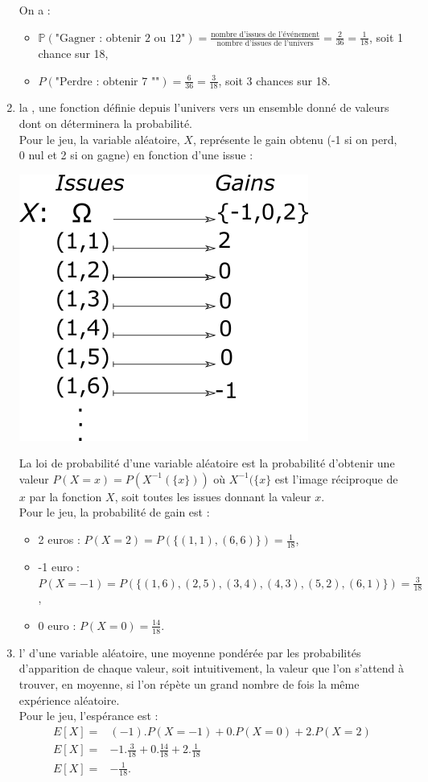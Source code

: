 \documentclass{book}
\begin{document}
\begin{enumerate}
\begin{center}
\end{center}
 On a :    
\begin{itemize}
\item $\mathbb{P}(\text{"Gagner : obtenir 2 ou 12"})=\frac{\text{nombre d'issues de l'événement}}{\text{nombre d'issues de l'univers}}=\frac{2}{36}=\frac{1}{18}$, soit 1 chance sur 18,
\item $P(\text{"Perdre : obtenir 7 ""})=\frac{6}{36}=\frac{3}{18}$, soit 3 chances sur 18.
\end{itemize}
\item  la , une fonction définie depuis l'univers vers un ensemble donné de valeurs dont on déterminera la probabilité.\\ 
Pour le jeu, la variable aléatoire, $X$, représente le gain obtenu (-1 si on perd, 0 nul et 2 si on gagne) en fonction d'une issue :
\begin{center}
\includegraphics[scale=0.5]{va.png}
\end{center}
La loi de probabilité d'une variable aléatoire est la probabilité d'obtenir une valeur $P(X=x)=P(X^{-1}(\{x\}))$ où $X^{-1}(\{x\}$ est l'image réciproque de $x$ par la fonction $X$,  soit toutes les issues donnant la valeur $x$.\\
Pour le jeu, la probabilité de gain est :
\begin{itemize}
\item  2 euros : $P(X=2)=P( \{(1,1),(6,6)\})=\frac{1}{18}$,
\item  -1 euro : $P(X=-1)=P( \{(1,6),(2,5),(3,4),(4,3),(5,2),(6,1)\})=\frac{3}{18}$,
\item  0 euro :  $P(X=0)=\frac{14}{18}$.
\end{itemize}
\item l' d'une variable aléatoire,  une moyenne pondérée par les probabilités d'apparition de chaque valeur, soit intuitivement, la valeur que l'on s'attend à trouver, en moyenne, si l'on répète un grand nombre de fois la même expérience aléatoire.\\
Pour le jeu, l'espérance est : 
\[
\begin{array}{rl}
E[X]=&(-1).P(X=-1) + 0.P(X=0)+2.P(X=2)\\
E[X]=&-1.\frac{3}{18}+ 0.\frac{14}{18}+ 2.\frac{1}{18}\\
E[X]=&-\frac{1}{18}.
\end{array}
\]
\end{enumerate}
\end{document}
